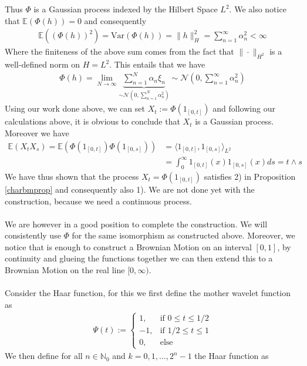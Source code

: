 \documentclass[11pt,a4paper, final]{article}
\theoremstyle{definition}
\begin{document}
Thus $\Phi$ is a Gaussian process indexed by the Hilbert Space $L^2$. We also notice that $\mathbb{E}( \Phi(h))=0$ and consequently 
\begin{align*}
\mathbb{E} ( ( \Phi(h))^2) = \text{Var}( \Phi(h))= \| h \|_H^2 = \sum_{n=1}^\infty \alpha_n^2 < \infty
\end{align*}
Where the finiteness of the above sum comes from the fact that $\| \cdot \|_{H^2}$ is a well-defined norm on $H=L^2.$ This entails that we have
\begin{align*}
\Phi(h)= \lim_{N \to \infty} \underbrace{\sum_{n=1}^N \alpha_n \xi_n}_{ \sim \mathcal{N}(0, \sum_{n=1}^N \alpha_n^2)} \sim \mathcal{N}\left( 0, \sum_{n=1}^\infty \alpha_n^2 \right)
\end{align*}
Using our work done above, we can set $X_t:= \Phi( 1_{[0,t]})$ and following our calculations above, it is obvious to conclude that $X_t$ is a Gaussian process. Moreover we have 
\begin{align*}
\mathbb{E}(X_t X_s) = \mathbb{E} \left( \Phi(1_{[0,t]}) \Phi(1_{[0,s]}) \right) &= \langle 1_{[0,t]},  1_{[0,s]}  \rangle_{L^2} \\ &= \int_0^\infty 1_{[0,t]}(x) 1_{[0,s]}(x) ds = t \wedge s  
\end{align*}
We have thus shown that the process $X_t = \Phi(1_{[0,t]})$ satisfies 2) in Proposition \ref{charbmprop} and consequently also 1). We are not done yet with the construction, because we need a continuous process. 
\\\\
We are however in a good position to complete the construction. We will consistently use $\Phi$ for the same isomorphism as constructed above. Moreover, we notice that is enough to construct a Brownian Motion on an interval $[0,1]$, by continuity and glueing the functions together we can then extend this to a Brownian Motion on the real line $[0, \infty)$.
\\\\
Consider the Haar function, for this we first define the mother wavelet function as 
\begin{align*}
\Psi (t) := \begin{cases}1, & \text{if } 0 \leq t \leq 1/2 \\
-1, & \text{if } 1/2 \leq t \leq 1 \\ 0, & \text{else} \end{cases}
\end{align*}
We then define for all $n \in \mathbb{N}_0$ and $k=0,1, \dots , 2^n-1$ the Haar function as 
\end{document}
